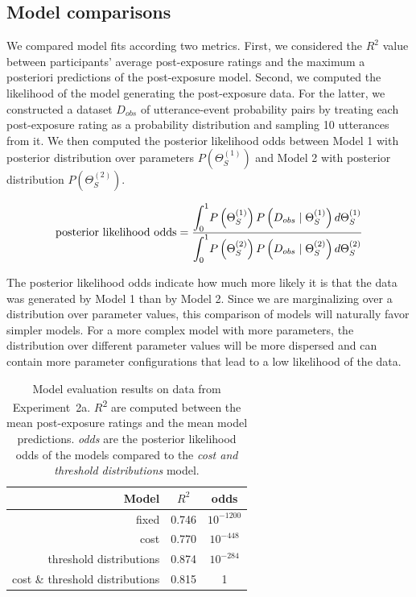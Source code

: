 \documentclass[man, floatsintext]{apa6}
\begin{document}
\subsection{Model comparisons}

We compared model fits according two metrics. First, we considered the $R^2$ value between participants' average post-exposure ratings and the maximum a posteriori predictions of the post-exposure model. Second, we computed the likelihood of the model generating the post-exposure data. For the latter, we constructed a dataset $D_{obs}$ of utterance-event probability pairs by treating each post-exposure rating as a probability distribution and sampling 10 utterances from it. We then computed the posterior likelihood odds between Model 1 with posterior distribution over parameters $P(\Theta_{S}^{(1)})$ and Model 2 with posterior distribution $P(\Theta_{S}^{(2)})$.

$$\mbox{posterior likelihood odds} = \frac{\mathlarger{\int_{0}^{1}} {P\left(\Theta_{S}^{(1)}\right) P\left(D_{obs} \mid \Theta_{S}^{(1)} \right) d   \Theta_{S}^{(1)}}}{\mathlarger{\int_0^1} P\left(\Theta_{S}^{(2)}\right) P\left(D_{obs} \mid \Theta_{S}^{(2)}\right)d   \Theta_{S}^{(2)} }$$
 
\noindent The posterior likelihood odds indicate how much more likely it is that the data was generated by Model 1 than by Model 2. Since we are marginalizing over a distribution over parameter values, this comparison of models will naturally
favor simpler models. For a more complex model with more parameters, the distribution over different parameter values will be more dispersed and can contain more parameter configurations that lead to a low likelihood of the data.

\begin{table}
\center
\begin{tabular}{r | c | c  }
Model & $R^2$ &   odds  \\ \midrule
fixed & 0.746 & $10^{-1200}$    \\
cost & 0.770 &  $10^{-448}$    \\
threshold distributions & 0.874 &  $10^{-284}$   \\
cost \& threshold distributions & 0.815 & 1 \\
\end{tabular}
\caption{Model evaluation results on data from Experiment~2a. $R$\textsuperscript{$2$} are computed between  the mean post-exposure ratings and the mean model predictions. \textit{odds} are the posterior likelihood odds of the models compared to the \textit{cost and threshold distributions} model. \label{tbl:model-comparison}}
\end{table}
\end{document}
